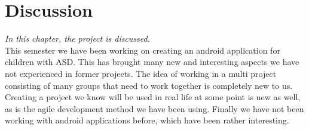 \chapter{Discussion}
\textit{In this chapter, the project is discussed.}\newline
\\
This semester we have been working on creating an android application for children with ASD. 
This has brought many new and interesting aspects we have not experienced in former projects. 
The idea of working in a multi project consisting of many groups that need to work together is completely new to us. 
Creating a project we know will be used in real life at some point is new as well, as is the agile development method we have been using. Finally we have not been working with android applications before, which have been rather interesting.\\ 
\\
